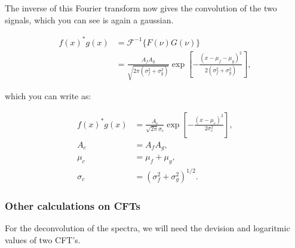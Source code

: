 The inverse of this Fourier transform now gives the convolution of the two signals, which you can see is again a gaussian.

\begin{equation}
\begin{aligned}
f(x)^* g(x) &=  \mathcal{F}^{-1}\{F(\nu)G(\nu)\} \\
&= \frac{A_f A_g}{\sqrt{2\pi\left(\sigma_f^{2}+\sigma_g^{2}\right)}} \exp{\left[-\frac{(x-\mu_f-\mu_g)^{2} }{2\left(\sigma_f^{2}+\sigma_g^{2}\right)}\right]},
\end{aligned}
\end{equation}


which you can write as:

\begin{equation}\label{eq_gauss_conv}
\begin{aligned}
f(x)^* g(x) &= \frac{A_c}{\sqrt{2\pi}\sigma_c} \exp{\left[-\frac{(x-\mu_c)^2}{2\sigma_c^2}\right]},\\
A_c &= A_f A_g,\\
\mu_c &= \mu_f + \mu_g,\\
\sigma_c &= (\sigma_f^2 + \sigma_g^2)^{1/2}.
\end{aligned}
\end{equation}

\subsubsection{Other calculations on CFTs}
For the deconvolution of the spectra, we will need the devision and logaritmic values of two CFT's. 













